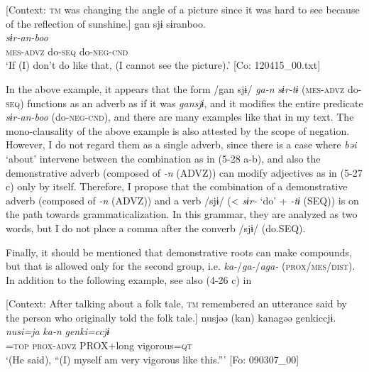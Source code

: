 \ea \label{ex:5:29}   [Context: \textsc{tm} was changing the angle of a picture since it was hard to see because of the reflection of sunshine.]
\glll  gan  sjɨ  sɨranboo.\\
\textit{}  \textit{}  \textit{sɨr-an-boo}\\
\textsc{mes}-\textsc{advz}  do-\textsc{seq}  do-\textsc{neg}-\textsc{cnd}\\
\glt ‘If (I) don’t do like that, (I cannot see the picture).’ [Co: 120415\_00.txt]
\z

In the above example, it appears that the form /gan sjɨ/ \textit{ga-n} \textit{sɨr-tɨ} (\textsc{mes}-\textsc{advz} do-\textsc{seq}) functions as an adverb as if it was \textit{gansjɨ}, and it modifies the entire predicate \textit{sɨr-an-boo} (do-\textsc{neg}-\textsc{cnd}), and there are many examples like that in my text. The mono-clausality of the above example is also attested by the scope of negation. However, I do not regard them as a single adverb, since there is a case where \textit{bəi} ‘about’ intervene between the combination as in (5-28 a-b), and also the demonstrative adverb (composed of \textit{{}-n} (ADVZ)) can modify adjectives as in (5-27 c) only by itself. Therefore, I propose that the combination of a demonstrative adverb (composed of \textit{{}-n} (ADVZ)) and a verb /sjɨ/ (< \textit{sɨr-} ‘do’ + \textit{{}-tɨ} (SEQ)) is on the path towards grammaticalization. In this grammar, they are analyzed as two words, but I do not place a comma after the converb /sjɨ/ (do.SEQ).

  Finally, it should be mentioned that demonstrative roots can make compounds, but that is allowed only for the second group, i.e. \textit{ka-}/\textit{ga-}/\textit{aga-} (\textsc{prox}/\textsc{mes}/\textsc{dist}). In addition to the following example, see also (4-26 c) in 

\ea \label{ex:5:30}   [Context: After talking about a folk tale, \textsc{tm} remembered an utterance said by the person who originally told the folk tale.]
\glll  nusjəə  (kan)  kanagəə  {\textbar}genki{\textbar}ccjɨ.\\
\textit{nusi=ja}  \textit{ka-n}  \textit{}  \textit{genki=ccjɨ}\\
\REF=\textsc{top}  \textsc{prox}-\textsc{advz}  PROX+long  vigorous=\textsc{qt}\\
\glt ‘(He said), “(I) myself am very vigorous like this.”’ [Fo: 090307\_00]
\z


